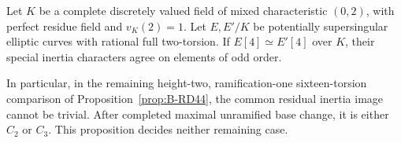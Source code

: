 \begin{proposition}
\label{prop:B-RD46}
Let $K$ be a complete discretely valued field of mixed characteristic
$(0,2)$, with perfect residue field and $v_K(2)=1$. Let $E,E'/K$ be
potentially supersingular elliptic curves with rational full
two-torsion. If $E[4]\simeq E'[4]$ over $K$, their special
inertia characters agree on elements of odd order.

In particular, in the remaining height-two, ramification-one
sixteen-torsion comparison of Proposition~\ref{prop:B-RD44},
the common residual inertia image cannot be trivial. After
completed maximal unramified base change, it is either $C_2$
or $C_3$. This proposition decides neither remaining case.
\end{proposition}
